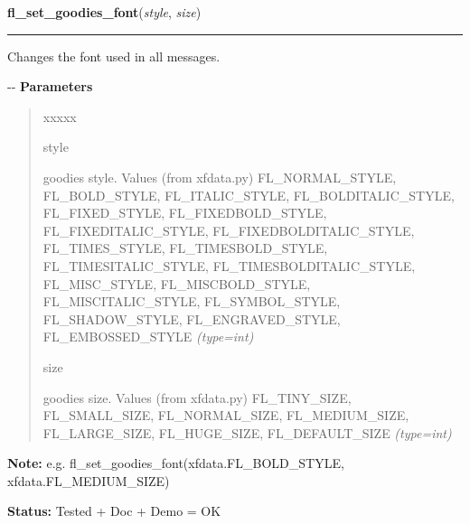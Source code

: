     \vspace{0.5ex}

\hspace{.8\funcindent}\begin{boxedminipage}{\funcwidth}

    \raggedright \textbf{fl\_set\_goodies\_font}(\textit{style}, \textit{size})

    \vspace{-1.5ex}

    \rule{\textwidth}{0.5\fboxrule}
\setlength{\parskip}{2ex}

Changes the font used in all messages.

-{}-
\setlength{\parskip}{1ex}
      \textbf{Parameters}
      \vspace{-1ex}

      \begin{quote}
        \begin{Ventry}{xxxxx}

          \item[style]


goodies style. Values (from xfdata.py) FL\_NORMAL\_STYLE, FL\_BOLD\_STYLE,
FL\_ITALIC\_STYLE, FL\_BOLDITALIC\_STYLE, FL\_FIXED\_STYLE,
FL\_FIXEDBOLD\_STYLE, FL\_FIXEDITALIC\_STYLE, FL\_FIXEDBOLDITALIC\_STYLE,
FL\_TIMES\_STYLE, FL\_TIMESBOLD\_STYLE, FL\_TIMESITALIC\_STYLE,
FL\_TIMESBOLDITALIC\_STYLE, FL\_MISC\_STYLE, FL\_MISCBOLD\_STYLE,
FL\_MISCITALIC\_STYLE, FL\_SYMBOL\_STYLE, FL\_SHADOW\_STYLE,
FL\_ENGRAVED\_STYLE, FL\_EMBOSSED\_STYLE
            {\it (type=int)}

          \item[size]


goodies size. Values (from xfdata.py) FL\_TINY\_SIZE, FL\_SMALL\_SIZE,
FL\_NORMAL\_SIZE, FL\_MEDIUM\_SIZE, FL\_LARGE\_SIZE, FL\_HUGE\_SIZE,
FL\_DEFAULT\_SIZE
            {\it (type=int)}

        \end{Ventry}

      \end{quote}

\textbf{Note:} 
e.g. fl\_set\_goodies\_font(xfdata.FL\_BOLD\_STYLE,         xfdata.FL\_MEDIUM\_SIZE)


\textbf{Status:} 
Tested + Doc + Demo = OK


    \end{boxedminipage}

    \label{xformslib:flgoodies:fl_show_message}

